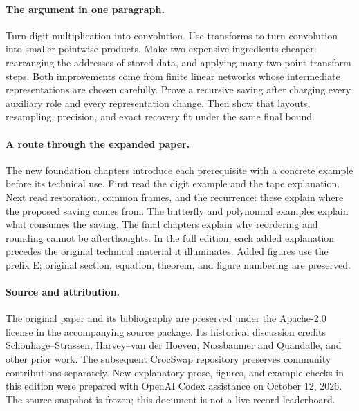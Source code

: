\paragraph{The argument in one paragraph.}
Turn digit multiplication into convolution. Use transforms to turn convolution
into smaller pointwise products. Make two expensive ingredients cheaper:
rearranging the addresses of stored data, and applying many two-point transform
steps. Both improvements come from finite linear networks whose intermediate
representations are chosen carefully. Prove a recursive saving after charging
every auxiliary role and every representation change. Then show that layouts,
resampling, precision, and exact recovery fit under the same final bound.

\paragraph{A route through the expanded paper.}
The new foundation chapters introduce each prerequisite with a concrete
example before its technical use. First read the digit example and the tape explanation. Next read restoration,
common frames, and the recurrence: these explain where the proposed saving
comes from. The butterfly and polynomial examples explain what consumes the
saving. The final chapters explain why reordering and rounding cannot be
afterthoughts. In the full edition, each added explanation precedes the original
technical material it illuminates. Added figures use the prefix E; original
section, equation, theorem, and figure numbering are preserved.


\paragraph{Source and attribution.}
The original paper and its bibliography are preserved under the Apache-2.0
license in the accompanying source package. Its historical discussion credits
Sch\"onhage--Strassen, Harvey--van der Hoeven, Nussbaumer and Quandalle, and
other prior work. The subsequent CrocSwap repository preserves community
contributions separately. New explanatory prose, figures, and example checks
in this edition were prepared with OpenAI Codex assistance on October 12, 2026.
The source snapshot is frozen; this document is not a live record leaderboard.
